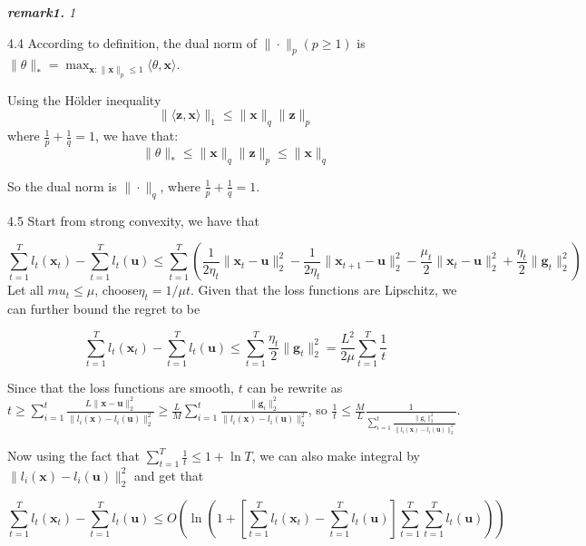 \documentclass{article}
\begin{document}
	\begin{framed}
	\begin{scriptsize}
	\begin{spacing}{1.2}
	\noindent\textit{\textbf{remark1.} 1}
	\end{spacing}
	\end{scriptsize}
	\end{framed}


\newpage

4.4 According to definition, the dual norm of $\|\cdot\|_p(p\geq 1)$ is $\|\theta\|_*=\max_{\mathbf{x}:\|\mathbf{x}\|_p\leq 1} \langle\theta,\mathbf{x}\rangle$. 

Using the H\"older inequality 
$$\|\langle\mathbf{z}, \mathbf{x}\rangle\|_1 \leq \|\mathbf{x}\|_q\|\mathbf{z}\|_p$$
where $\frac{1}{p}+\frac{1}{q}=1$, we have that: 
$$\|\theta\|_*\leq \|\mathbf{x}\|_q\|\mathbf{z}\|_p \leq \|\mathbf{x}\|_q$$

So the dual norm is $\|\cdot\|_q$, where $\frac{1}{p}+\frac{1}{q}=1$.

4.5  Start from strong convexity, we have that

$$\sum_{t=1}^T l_t(\mathbf{x}_t) - \sum_{t=1}^T l_t(\mathbf{u}) \leq \sum_{t=1}^T \left( \frac{1}{2\eta_t} \|\mathbf{x}_t - \mathbf{u}\|^2_2  - \frac{1}{2\eta_t} \|\mathbf{x}_{t+1} - \mathbf{u}\|^2_2 - \frac{\mu_t}{2} \|\mathbf{x}_t - \mathbf{u}\|^2_2 + \frac{\eta_t}{2} \|\mathbf{g}_t\|^2_2 \right)$$
Let all $mu_t\leq \mu$, choose$\eta_t = 1/\mu t$. Given that the loss functions are Lipschitz, we can further bound the regret to be 

$$\sum_{t=1}^T l_t(\mathbf{x}_t) - \sum_{t=1}^T l_t(\mathbf{u}) \leq \sum_{t=1}^T \frac{\eta_t}{2} \|\mathbf{g}_t\|^2_2 =\frac{L^2}{2\mu}  \sum_{t=1}^T \frac{1}{t}$$

Since that the loss functions are smooth, $t$ can be rewrite as $t \geq \sum_{i=1}^t \frac{L \|\mathbf{x} - \mathbf{u} \|^2_2}{\|l_i(\mathbf{x}) -  l_i(\mathbf{u}) \|^2_2} \geq \frac{L}{M} \sum_{i=1}^t \frac{ \|\mathbf{g}_i \|^2_2}{\|l_i(\mathbf{x}) -  l_i(\mathbf{u}) \|^2_2}$, so $\frac{1}{t}\leq \frac{M}{L}\frac{1}{\sum_{i=1}^t \frac{ \|\mathbf{g}_i \|^2_2}{\|l_i(\mathbf{x}) -  l_i(\mathbf{u}) \|^2_2}} $.

Now using the fact that $\sum_{t=1}^T \frac{1}{t} \leq 1 + \ln T$, we can also make integral by $\|l_i(\mathbf{x}) -  l_i(\mathbf{u}) \|^2_2$ and get that 

$$\sum_{t=1}^T l_t(\mathbf{x}_t) - \sum_{t=1}^T l_t(\mathbf{u}) \leq O(\ln (1+ [\sum_{t=1}^T l_t(\mathbf{x}_t) - \sum_{t=1}^T l_t(\mathbf{u}) ] \sum_{t=1}^T \sum_{t=1}^T l_t(\mathbf{u}) ))$$
\end{document}

